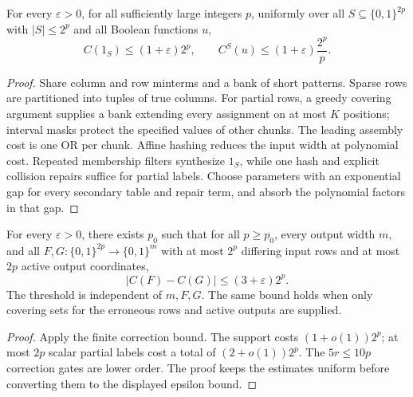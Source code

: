 \begin{theorem}
  \label{thm:lowerbounds-square-root-synthesis}
  \leanok
  For every $\varepsilon>0$, for all sufficiently large integers $p$,
  uniformly over all $S\subseteq\{0,1\}^{2p}$ with $|S|\le 2^p$ and all
  Boolean functions $u$,
  \[
    C(1_S)\le(1+\varepsilon)2^p,
    \qquad
    C^S(u)\le(1+\varepsilon)\frac{2^p}{p}.
  \]
\end{theorem}
\begin{proof}
  \leanok
  Share column and row minterms and a bank of short patterns. Sparse rows
  are partitioned into tuples of true columns. For partial rows, a greedy
  covering argument supplies a bank extending every assignment on at most
  $K$ positions; interval masks protect the specified values of other chunks.
  The leading assembly cost is one OR per chunk. Affine hashing reduces the
  input width at polynomial cost. Repeated membership filters synthesize
  $1_S$, while one hash and explicit collision repairs suffice for partial
  labels. Choose parameters with an exponential gap for every secondary
  table and repair term, and absorb the polynomial factors in that gap.
\end{proof}

\begin{theorem}
  \label{thm:lowerbounds-square-root-correction}
  \leanok
  For every $\varepsilon>0$, there exists $p_0$ such that for all $p\ge p_0$,
  every output width $m$, and all
  $F,G:\{0,1\}^{2p}\to\{0,1\}^m$ with at most $2^p$ differing input rows
  and at most $2p$ active output coordinates,
  \[
    |C(F)-C(G)|\le(3+\varepsilon)2^p.
  \]
  The threshold is independent of $m,F,G$. The same bound holds when only
  covering sets for the erroneous rows and active outputs are supplied.
\end{theorem}
\begin{proof}
  \leanok
  Apply the finite correction bound. The support costs $(1+o(1))2^p$;
  at most $2p$ scalar partial labels cost a total of $(2+o(1))2^p$.
  The $5r\le 10p$ correction gates are lower order. The proof keeps the
  estimates uniform before converting them to the displayed epsilon bound.
\end{proof}

